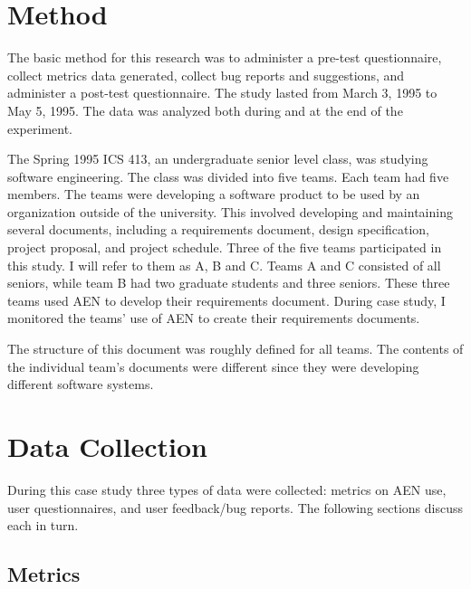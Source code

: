 \section{Method}
\label{sec:method}

The basic method for this research was to administer a pre-test questionnaire,
collect metrics data generated, collect bug reports and suggestions, and
administer a post-test questionnaire.  The study lasted from March 3, 1995 to
May 5, 1995.  The data was analyzed both during and at the end of the
experiment.

The Spring 1995 ICS 413, an undergraduate senior level class, was studying
software engineering.  The class was divided into five teams.  Each team
had five members.  The teams were developing a software product to be used
by an organization outside of the university.  This involved developing and
maintaining several documents, including a requirements document, design
specification, project proposal, and project schedule.  Three of the five
teams participated in this study.  I will refer to them as A, B and C.
Teams A and C consisted of all seniors, while team B had two graduate
students and three seniors.  These three teams used AEN to develop their
requirements document.  During case study, I monitored the teams' use of
AEN to create their requirements documents.

The structure of this document was roughly defined for all teams.  The
contents of the individual team's documents were different since they were
developing different software systems.

\section{Data Collection}
\label{sec:datacollection}

During this case study three types of data were collected: metrics on AEN
use, user questionnaires, and user feedback/bug reports.  The following
sections discuss each in turn.

\subsection{Metrics}
\label{sec:metrics-description}


